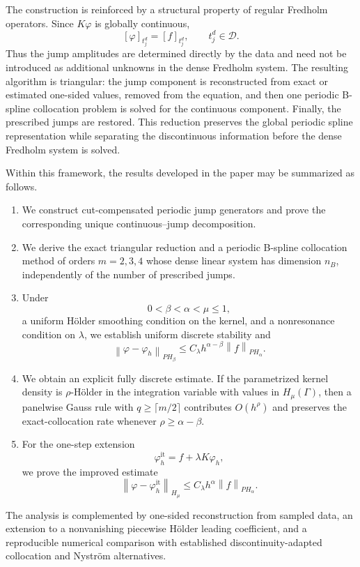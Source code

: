 \documentclass[11pt,a4paper]{amsart}
\theoremstyle{plain}
\theoremstyle{definition}
\theoremstyle{remark}
\newcommand{\Ga}{\Gamma}
\newcommand{\D}{\mathcal D}
\newcommand{\norm}[1]{\left\|#1\right\|}
\begin{document}
The construction is reinforced by a structural property of regular Fredholm operators.  Since $K\varphi$ is globally continuous,
\[
        [\varphi]_{t_j^d}=[f]_{t_j^d},
        \qquad t_j^d\in\D.
\]
Thus the jump amplitudes are determined directly by the data and need not be introduced as additional unknowns in the dense Fredholm system.  The resulting algorithm is triangular: the jump component is reconstructed from exact or estimated one-sided values, removed from the equation, and then one periodic B-spline collocation problem is solved for the continuous component.  Finally, the prescribed jumps are restored.  This reduction preserves the global periodic spline representation while separating the discontinuous information before the dense Fredholm system is solved.

Within this framework, the results developed in the paper may be summarized as follows.
\begin{enumerate}[label=(\roman*),leftmargin=1.1cm]
\item We construct cut-compensated periodic jump generators and prove the corresponding unique continuous--jump decomposition.
\item We derive the exact triangular reduction and a periodic B-spline collocation method of orders $m=2,3,4$ whose dense linear system has dimension $n_B$, independently of the number of prescribed jumps.
\item Under
\[
        0<\beta<\alpha<\mu\le1,
\]
a uniform H\"older smoothing condition on the kernel, and a nonresonance condition on $\lambda$, we establish uniform discrete stability and
\[
        \norm{\varphi-\varphi_h}_{PH_\beta}
        \le
        C_\lambda h^{\alpha-\beta}
        \norm{f}_{PH_\alpha}.
\]
\item We obtain an explicit fully discrete estimate.  If the parametrized kernel density is $\rho$-H\"older in the integration variable with values in $H_\mu(\Ga)$, then a panelwise Gauss rule with $q\ge\lceil m/2\rceil$ contributes $O(h^\rho)$ and preserves the exact-collocation rate whenever $\rho\ge\alpha-\beta$.
\item For the one-step extension
\[
        \varphi_h^{\mathrm{it}}
        =f+\lambda K\varphi_h,
\]
we prove the improved estimate
\[
        \norm{\varphi-\varphi_h^{\mathrm{it}}}_{H_\mu}
        \le
        C_\lambda h^\alpha\norm{f}_{PH_\alpha}.
\]
\end{enumerate}
The analysis is complemented by one-sided reconstruction from sampled data, an extension to a nonvanishing piecewise H\"older leading coefficient, and a reproducible numerical comparison with established discontinuity-adapted collocation and Nystr\"om alternatives.
\end{document}
